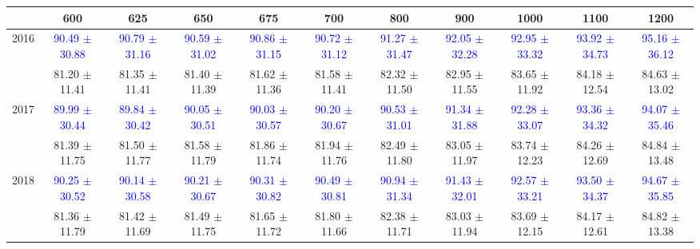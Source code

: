 {
\renewcommand{\arraystretch}{1.0}
\begin{center}
\begin{small}
\begin{tabular}{ccccccccccc}
\hline\hline
 & 600 & 625 & 650 & 675 & 700 & 800 & 900 & 1000 & 1100 & 1200 \\
\hline
\multirow{2}{*}{2016} & \textcolor{blue}{90.49 $\pm$ 30.88} & \textcolor{blue}{90.79 $\pm$ 31.16} & \textcolor{blue}{90.59 $\pm$ 31.02} & \textcolor{blue}{90.86 $\pm$ 31.15} & \textcolor{blue}{90.72 $\pm$ 31.12} & \textcolor{blue}{91.27 $\pm$ 31.47} & \textcolor{blue}{92.05 $\pm$ 32.28} & \textcolor{blue}{92.95 $\pm$ 33.32} & \textcolor{blue}{93.92 $\pm$ 34.73} & \textcolor{blue}{95.16 $\pm$ 36.12} \\
 & \textcolor{myred}{81.20 $\pm$ 11.41} & \textcolor{myred}{81.35 $\pm$ 11.41} & \textcolor{myred}{81.40 $\pm$ 11.39} & \textcolor{myred}{81.62 $\pm$ 11.36} & \textcolor{myred}{81.58 $\pm$ 11.41} & \textcolor{myred}{82.32 $\pm$ 11.50} & \textcolor{myred}{82.95 $\pm$ 11.55} & \textcolor{myred}{83.65 $\pm$ 11.92} & \textcolor{myred}{84.18 $\pm$ 12.54} & \textcolor{myred}{84.63 $\pm$ 13.02} \\
\hline
\multirow{2}{*}{2017} & \textcolor{blue}{89.99 $\pm$ 30.44} & \textcolor{blue}{89.84 $\pm$ 30.42} & \textcolor{blue}{90.05 $\pm$ 30.51} & \textcolor{blue}{90.03 $\pm$ 30.57} & \textcolor{blue}{90.20 $\pm$ 30.67} & \textcolor{blue}{90.53 $\pm$ 31.01} & \textcolor{blue}{91.34 $\pm$ 31.88} & \textcolor{blue}{92.28 $\pm$ 33.07} & \textcolor{blue}{93.36 $\pm$ 34.32} & \textcolor{blue}{94.07 $\pm$ 35.46} \\
 & \textcolor{myred}{81.39 $\pm$ 11.75} & \textcolor{myred}{81.50 $\pm$ 11.77} & \textcolor{myred}{81.58 $\pm$ 11.79} & \textcolor{myred}{81.86 $\pm$ 11.74} & \textcolor{myred}{81.94 $\pm$ 11.76} & \textcolor{myred}{82.49 $\pm$ 11.80} & \textcolor{myred}{83.05 $\pm$ 11.97} & \textcolor{myred}{83.74 $\pm$ 12.23} & \textcolor{myred}{84.26 $\pm$ 12.69} & \textcolor{myred}{84.84 $\pm$ 13.48} \\
\hline
\multirow{2}{*}{2018} & \textcolor{blue}{90.25 $\pm$ 30.52} & \textcolor{blue}{90.14 $\pm$ 30.58} & \textcolor{blue}{90.21 $\pm$ 30.67} & \textcolor{blue}{90.31 $\pm$ 30.82} & \textcolor{blue}{90.49 $\pm$ 30.81} & \textcolor{blue}{90.94 $\pm$ 31.34} & \textcolor{blue}{91.43 $\pm$ 32.01} & \textcolor{blue}{92.57 $\pm$ 33.21} & \textcolor{blue}{93.50 $\pm$ 34.37} & \textcolor{blue}{94.67 $\pm$ 35.85} \\
 & \textcolor{myred}{81.36 $\pm$ 11.79} & \textcolor{myred}{81.42 $\pm$ 11.69} & \textcolor{myred}{81.49 $\pm$ 11.75} & \textcolor{myred}{81.65 $\pm$ 11.72} & \textcolor{myred}{81.80 $\pm$ 11.66} & \textcolor{myred}{82.38 $\pm$ 11.71} & \textcolor{myred}{83.03 $\pm$ 11.94} & \textcolor{myred}{83.69 $\pm$ 12.15} & \textcolor{myred}{84.17 $\pm$ 12.61} & \textcolor{myred}{84.82 $\pm$ 13.38} \\
\hline\hline
\end{tabular}
\end{small}
\end{center}
}

